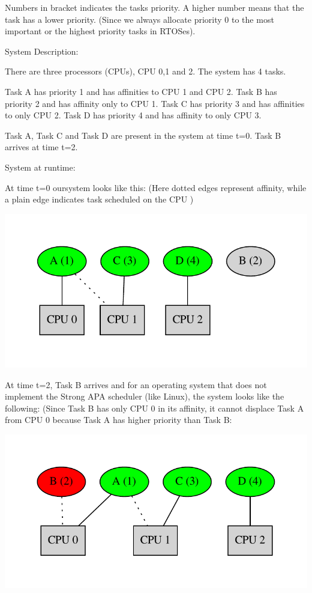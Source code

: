 Numbers in bracket indicate\textquotesingle{}s the task\textquotesingle{}s priority. A higher number means that the task has a lower priority. (Since we always allocate priority 0 to the most important or the highest priority tasks in R\+T\+O\+Ses).

System Description\+:

There are three processors (C\+P\+Us), C\+PU 0,1 and 2. The system has 4 tasks.

Task A has priority 1 and has affinities to C\+PU 1 and C\+PU 2. Task B has priority 2 and has affinity only to C\+PU 1. Task C has priority 3 and has affinities to only C\+PU 2. Task D has priority 4 and has affinity to only C\+PU 3.

Task A, Task C and Task D are present in the system at time t=0. Task B arrives at time t=2.

System at runtime\+:

At time t=0 oursystem looks like this\+: (Here dotted edges represent affinity, while a plain edge indicates task scheduled on the C\+PU )


\begin{DoxyImageNoCaption}
  \mbox{\includegraphics[width=\textwidth,height=\textheight/2,keepaspectratio=true]{dot_inline_dotgraph_2}}
\end{DoxyImageNoCaption}


At time t=2, Task B arrives and for an operating system that does not implement the Strong A\+PA scheduler (like Linux), the system looks like the following\+: (Since Task B has only C\+PU 0 in its affinity, it cannot displace Task A from C\+PU 0 because Task A has higher priority than Task B\+:


\begin{DoxyImageNoCaption}
  \mbox{\includegraphics[width=\textwidth,height=\textheight/2,keepaspectratio=true]{dot_inline_dotgraph_3}}
\end{DoxyImageNoCaption}


